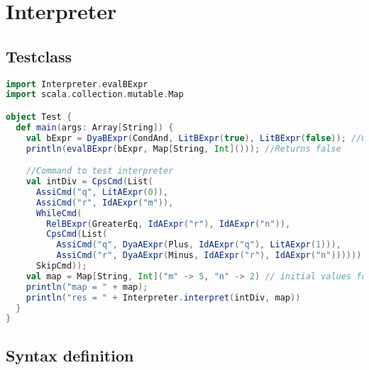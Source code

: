 \section{Interpreter}

\subsection{Testclass}

\begin{lstlisting}[language=Scala]
import Interpreter.evalBExpr
import scala.collection.mutable.Map

object Test {
  def main(args: Array[String]) {
    val bExpr = DyaBExpr(CondAnd, LitBExpr(true), LitBExpr(false)); //Comparision of true AND false
    println(evalBExpr(bExpr, Map[String, Int]())); //Returns false

    //Command to test interpreter
    val intDiv = CpsCmd(List(
      AssiCmd("q", LitAExpr(0)),
      AssiCmd("r", IdAExpr("m")),
      WhileCmd(
        RelBExpr(GreaterEq, IdAExpr("r"), IdAExpr("n")),
        CpsCmd(List(
          AssiCmd("q", DyaAExpr(Plus, IdAExpr("q"), LitAExpr(1))),
          AssiCmd("r", DyaAExpr(Minus, IdAExpr("r"), IdAExpr("n")))))),
      SkipCmd));
    val map = Map[String, Int]("m" -> 5, "n" -> 2) // initial values for m and n
    println("map = " + map);
    println("res = " + Interpreter.interpret(intDiv, map))
  }
}
\end{lstlisting}

\subsection{Syntax definition}

